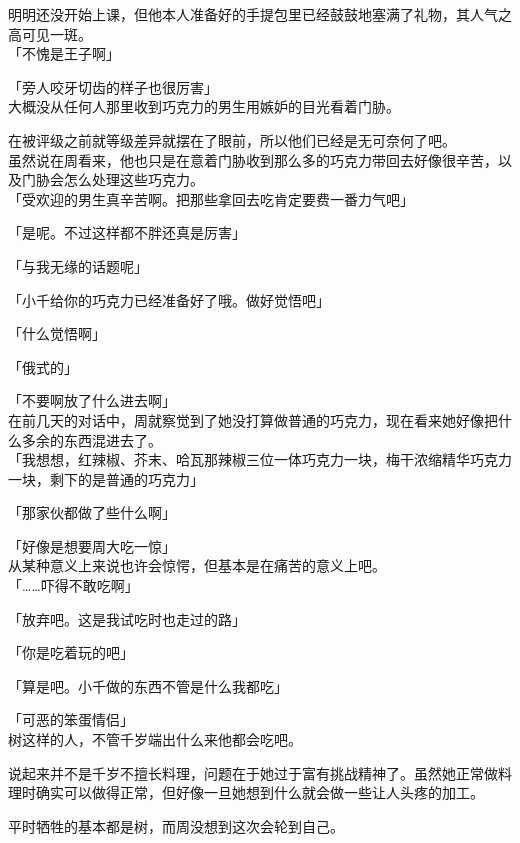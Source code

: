 明明还没开始上课，但他本人准备好的手提包里已经鼓鼓地塞满了礼物，其人气之高可见一斑。\\

「不愧是王子啊」

「旁人咬牙切齿的样子也很厉害」\\

大概没从任何人那里收到巧克力的男生用嫉妒的目光看着门胁。

在被评级之前就等级差异就摆在了眼前，所以他们已经是无可奈何了吧。\\

虽然说在周看来，他也只是在意着门胁收到那么多的巧克力带回去好像很辛苦，以及门胁会怎么处理这些巧克力。\\

「受欢迎的男生真辛苦啊。把那些拿回去吃肯定要费一番力气吧」

「是呢。不过这样都不胖还真是厉害」

「与我无缘的话题呢」

「小千给你的巧克力已经准备好了哦。做好觉悟吧」

「什么觉悟啊」

「俄式的」

「不要啊放了什么进去啊」\\

在前几天的对话中，周就察觉到了她没打算做普通的巧克力，现在看来她好像把什么多余的东西混进去了。\\

「我想想，红辣椒、芥末、哈瓦那辣椒三位一体巧克力一块，梅干浓缩精华巧克力一块，剩下的是普通的巧克力」

「那家伙都做了些什么啊」

「好像是想要周大吃一惊」\\

从某种意义上来说也许会惊愕，但基本是在痛苦的意义上吧。\\

「……吓得不敢吃啊」

「放弃吧。这是我试吃时也走过的路」

「你是吃着玩的吧」

「算是吧。小千做的东西不管是什么我都吃」

「可恶的笨蛋情侣」\\

树这样的人，不管千岁端出什么来他都会吃吧。

说起来并不是千岁不擅长料理，问题在于她过于富有挑战精神了。虽然她正常做料理时确实可以做得正常，但好像一旦她想到什么就会做一些让人头疼的加工。

平时牺牲的基本都是树，而周没想到这次会轮到自己。\\

